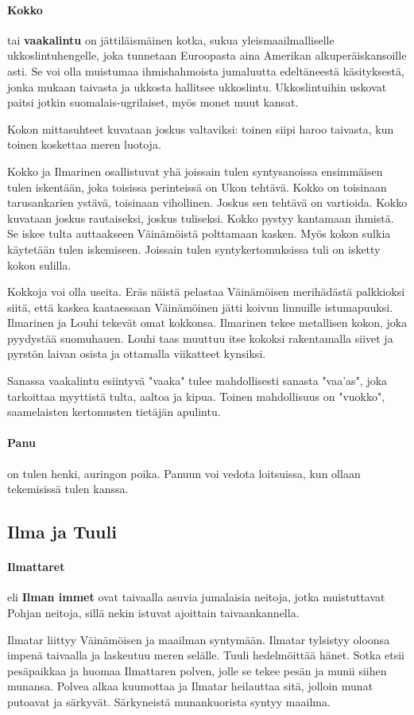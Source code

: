   \paragraph{Kokko} tai \textbf{vaakalintu} on jättiläismäinen kotka, sukua yleismaailmalliselle
    ukkos\-lintuhengelle, joka tunnetaan Euroopasta aina Amerikan alkuperäiskansoille asti. Se
    voi olla muistumaa ihmishahmoista jumaluutta edeltäneestä käsityksestä, jonka mukaan taivasta
    ja ukkosta hallitsee ukkoslintu. Ukkoslintuihin uskovat paitsi jotkin suomalais-ugrilaiset,
    myös monet muut kansat.
    \par
    Kokon mittasuhteet kuvataan joskus valtaviksi: toinen siipi haroo taivasta, kun toinen
    koskettaa meren luotoja.
    \par
    Kokko ja Ilmarinen osallistuvat yhä joissain tulen syntysanoissa ensimmäisen tulen iskentään,
    joka toisissa perinteissä on Ukon tehtävä. Kokko on toisinaan tarusankarien ystävä, toisinaan
    vihollinen. Joskus sen tehtävä on vartioida. Kokko kuvataan joskus rautaiseksi, joskus
    tuliseksi. Kokko pystyy kantamaan ihmistä. Se iskee tulta auttaakseen Väinämöistä polttamaan
    kasken. Myös kokon sulkia käytetään tulen iskemiseen. Joissain tulen syntykertomuksissa tuli
    on isketty kokon sulilla.
    \par
    Kokkoja voi olla useita. Eräs näistä pelastaa Väinämöisen merihädästä palkkioksi siitä, että
    kaskea kaataessaan Väinämöinen jätti koivun linnuille istumapuuksi. Ilmarinen ja Louhi tekevät
    omat kokkonsa. Ilmarinen tekee metallisen kokon, joka pyydystää suomuhauen. Louhi taas muuttuu
    itse kokoksi rakentamalla siivet ja pyrstön laivan osista ja ottamalla viikatteet
    kynsiksi.
    \par
    Sanassa vaakalintu esiintyvä "vaaka" tulee mahdollisesti sanasta "vaa’as", joka tarkoittaa
    myyttistä tulta, aaltoa ja kipua. Toinen mahdollisuus on "vuokko", saamelaisten kertomusten
    tietäjän apulintu.
  \paragraph{Panu} on tulen henki, auringon poika. Panuun voi vedota loitsuissa, kun ollaan
    tekemisissä tulen kanssa.


\subsection{Ilma ja Tuuli}

  \paragraph{Ilmattaret} eli \textbf{Ilman immet} ovat taivaalla asuvia jumalaisia neitoja, jotka
    muistuttavat Pohjan neitoja, sillä nekin istuvat ajoittain taivaankannella.
    \par
    Ilmatar liittyy Väinämöisen ja maailman syntymään. Ilmatar tylsistyy oloonsa impenä taivaalla
    ja laskeutuu meren selälle. Tuuli hedelmöittää hänet. Sotka etsii pesäpaikkaa ja huomaa
    Ilmattaren polven, jolle se tekee pesän ja munii siihen munansa. Polvea alkaa kuumottaa ja
    Ilmatar heilauttaa sitä, jolloin munat putoavat ja särkyvät. Särkyneistä munankuorista syntyy
    maailma.
